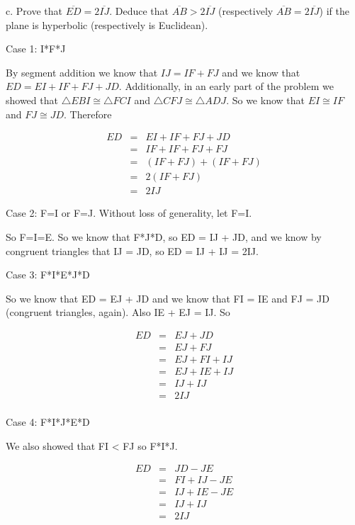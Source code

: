 \documentclass[12pt,letterpaper]{article}
\newcommand{\Proof}{\noindent {\bf Proof: }}
\begin{document}
\newpage 

c. Prove that $\overline{ED} = 2\overline{IJ}$.  Deduce that $\overline{AB} > 2\overline{IJ}$ (respectively $\overline{AB} = 2\overline{IJ}$) if the plane is hyperbolic (respectively is Euclidean).\\

\Proof


Case 1: I*F*J

By segment addition we know that $IJ = IF + FJ$ and we know that $ED = EI + IF + FJ + JD$.  Additionally, in an early part of the problem we showed that $\triangle EBI \cong \triangle FCI$ and $\triangle CFJ \cong \triangle ADJ$.  So we know that $EI \cong IF$ and $FJ \cong JD$.  Therefore 

\begin{eqnarray*}
ED &=& EI + IF + FJ + JD\\
&=& IF + IF + FJ + FJ\\
&=& (IF + FJ) + (IF + FJ)\\
&=& 2(IF + FJ)\\
&=& 2IJ
\end{eqnarray*}

Case 2: F=I or F=J.  Without loss of generality, let F=I. 

So F=I=E.  So we know that F*J*D, so ED = IJ + JD, and we know by congruent triangles that IJ = JD, so ED = IJ + IJ = 2IJ.

Case 3:  F*I*E*J*D

So we know that ED = EJ + JD and we know that FI = IE and FJ = JD (congruent triangles, again).  Also IE + EJ = IJ.  So 

\begin{eqnarray*}
ED &=& EJ + JD\\
&=& EJ + FJ \\
&=& EJ + FI + IJ\\
&=& EJ + IE + IJ\\
&=& IJ + IJ\\
&=& 2IJ\\
\end{eqnarray*}


Case 4: F*I*J*E*D

We also showed that FI < FJ so F*I*J. 

\begin{eqnarray*}
ED &=& JD - JE\\
&=& FI + IJ -JE\\
&=& IJ + IE - JE\\
&=& IJ + IJ\\
&=& 2IJ\\
\end{eqnarray*}
\end{document}
